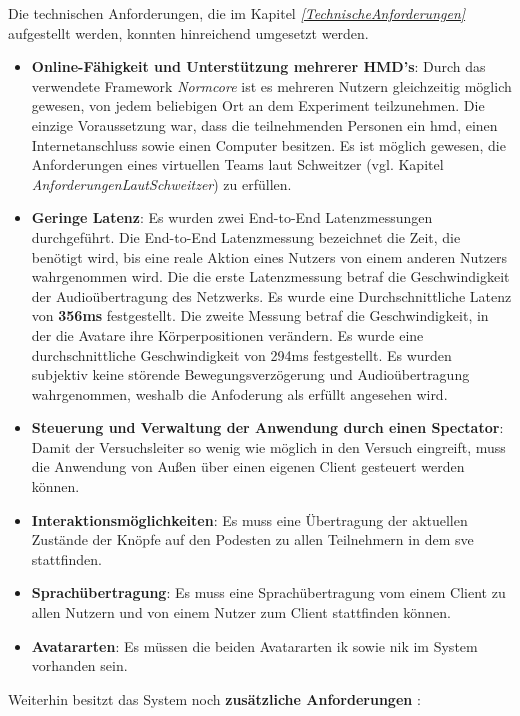 \documentclass[a4paper,11pt]{article}%
\renewcommand{\\}{\vspace*{0.5\baselineskip} \newline}
\begin{document}
Die technischen Anforderungen, die im Kapitel \textit{\ref{TechnischeAnforderungen}} aufgestellt werden, konnten hinreichend umgesetzt werden.
\begin{itemize}
\item \textbf{Online-Fähigkeit und Unterstützung mehrerer HMD's}: Durch das verwendete Framework \textit{Normcore} ist es mehreren Nutzern gleichzeitig möglich gewesen, von jedem beliebigen Ort an dem Experiment teilzunehmen. Die einzige Voraussetzung war, dass die teilnehmenden Personen ein \ac{hmd}, einen Internetanschluss sowie einen Computer besitzen. Es ist möglich gewesen, die Anforderungen eines virtuellen Teams laut Schweitzer \citep[p.270]{schweitzer2010conceptualizing} (vgl. Kapitel \textit{AnforderungenLautSchweitzer}) zu erfüllen. 
\item \textbf{Geringe Latenz}: Es wurden zwei End-to-End Latenzmessungen durchgeführt. Die End-to-End Latenzmessung bezeichnet die Zeit, die benötigt wird, bis eine reale Aktion eines Nutzers von einem anderen Nutzers wahrgenommen wird. Die die erste Latenzmessung betraf die Geschwindigkeit der Audioübertragung des Netzwerks. Es wurde eine Durchschnittliche Latenz von \textbf{356ms} festgestellt.
Die zweite Messung betraf die Geschwindigkeit, in der die Avatare ihre Körperpositionen verändern. Es wurde eine durchschnittliche Geschwindigkeit von 294ms festgestellt.
Es wurden subjektiv keine störende Bewegungsverzögerung und Audioübertragung wahrgenommen, weshalb die Anfoderung als erfüllt angesehen wird.
\item \textbf{Steuerung und Verwaltung der Anwendung durch einen Spectator}: Damit der Versuchsleiter so wenig wie möglich in den Versuch eingreift, muss die Anwendung von Außen über einen eigenen Client gesteuert werden können.
\item \textbf{Interaktionsmöglichkeiten}: Es muss eine Übertragung der aktuellen Zustände der Knöpfe auf den Podesten zu allen Teilnehmern in dem \ac{sve} stattfinden.
\item \textbf{Sprachübertragung}: Es muss eine Sprachübertragung vom einem Client zu allen Nutzern und von einem Nutzer zum Client stattfinden können.
\item \textbf{Avatararten}: Es müssen die beiden Avatararten \ac{ik} sowie \ac{nik} im System vorhanden sein.
\end{itemize}

Weiterhin besitzt das System noch \textbf{zusätzliche Anforderungen} :
\end{document}
